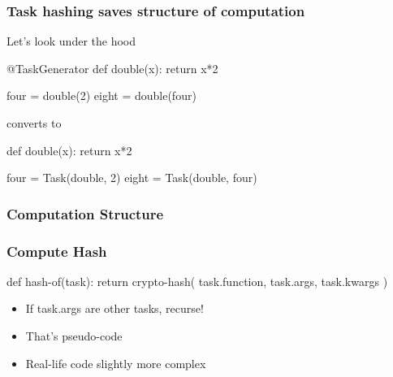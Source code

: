 \documentclass{beamer}
\begin{document}
\begin{frame}[fragile]
\frametitle{Task hashing saves structure of computation}

\begin{block}{Let's look under the hood}
\begin{python}
@TaskGenerator
def double(x):
    return x*2

four = double(2)
eight = double(four)
\end{python}

\alert{converts to}

\begin{python}

def double(x):
    return x*2

four = Task(double, 2)
eight = Task(double, four)
\end{python}

\end{block}

\end{frame}

\begin{frame}[fragile]
\frametitle{Computation Structure}


\begin{center}

\end{center}

\end{frame}

\begin{frame}[fragile]
\frametitle{Compute Hash}

\begin{python}
def hash-of(task):
    return crypto-hash( {
            task.function,
            task.args,
            task.kwargs })
\end{python}

\begin{itemize}
\item If \alert{task.args} are other tasks, recurse!
\item That's \alert{pseudo-code}
\item Real-life code \alert{slightly more complex}
\end{itemize}

\end{frame}
\end{document}
